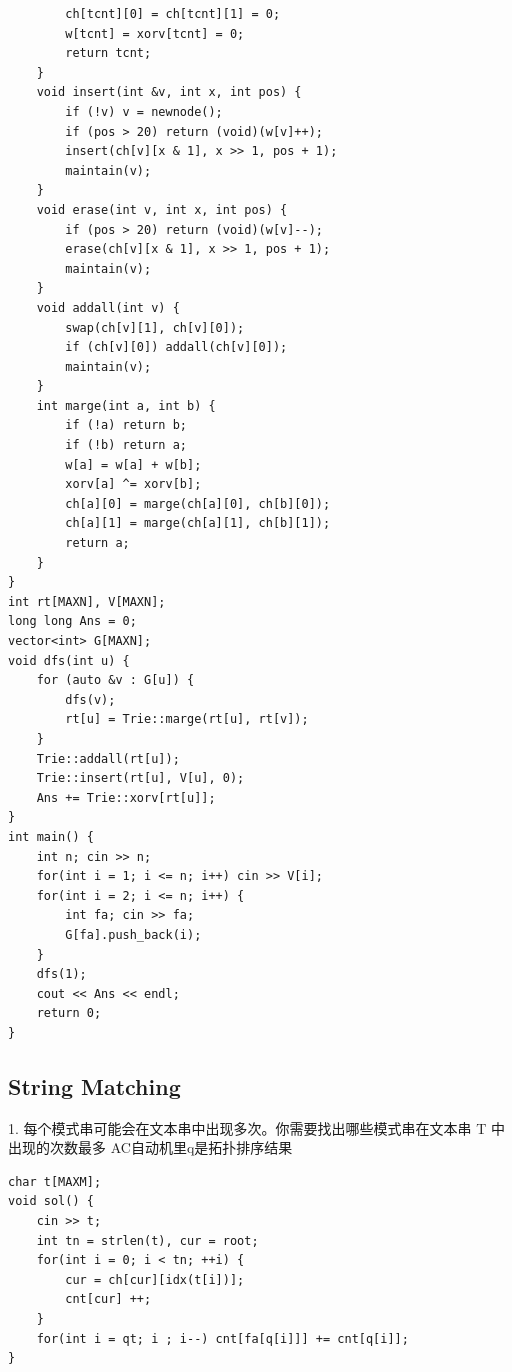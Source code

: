 \documentclass[10pt]{ctexart}
\begin{document}
{\begin{lstlisting}
        ch[tcnt][0] = ch[tcnt][1] = 0;
        w[tcnt] = xorv[tcnt] = 0;
        return tcnt;
    }
    void insert(int &v, int x, int pos) {
        if (!v) v = newnode();
        if (pos > 20) return (void)(w[v]++);
        insert(ch[v][x & 1], x >> 1, pos + 1);
        maintain(v);
    }
    void erase(int v, int x, int pos) {
        if (pos > 20) return (void)(w[v]--);
        erase(ch[v][x & 1], x >> 1, pos + 1);
        maintain(v);
    }
    void addall(int v) {
        swap(ch[v][1], ch[v][0]);
        if (ch[v][0]) addall(ch[v][0]);
        maintain(v);
    }
    int marge(int a, int b) {
        if (!a) return b;
        if (!b) return a;
        w[a] = w[a] + w[b];
        xorv[a] ^= xorv[b];
        ch[a][0] = marge(ch[a][0], ch[b][0]);
        ch[a][1] = marge(ch[a][1], ch[b][1]);
        return a;
    }
}
int rt[MAXN], V[MAXN];
long long Ans = 0;
vector<int> G[MAXN];
void dfs(int u) {
    for (auto &v : G[u]) {
        dfs(v);
        rt[u] = Trie::marge(rt[u], rt[v]);
    }
    Trie::addall(rt[u]);
    Trie::insert(rt[u], V[u], 0);
    Ans += Trie::xorv[rt[u]];
}
int main() {
    int n; cin >> n;
    for(int i = 1; i <= n; i++) cin >> V[i];
    for(int i = 2; i <= n; i++) {
        int fa; cin >> fa;
        G[fa].push_back(i);
    }
    dfs(1);
    cout << Ans << endl;
    return 0;
}
\end{lstlisting}

\subsection{String Matching}
1. 每个模式串可能会在文本串中出现多次。你需要找出哪些模式串在文本串 T 中出现的次数最多
AC自动机里q是拓扑排序结果
\begin{lstlisting}
char t[MAXM];
void sol() {
    cin >> t;
    int tn = strlen(t), cur = root;
    for(int i = 0; i < tn; ++i) {
        cur = ch[cur][idx(t[i])];
        cnt[cur] ++;
    }
    for(int i = qt; i ; i--) cnt[fa[q[i]]] += cnt[q[i]];
}
\end{lstlisting}

}
\end{document}
